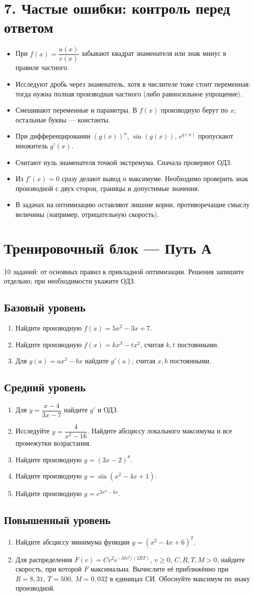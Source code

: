 \documentclass[a4paper,12pt]{article}
\newcommand{\sect}[1]{\section*{\textcolor{darkaccent}{#1}}}
\newcommand{\subsect}[1]{\subsection*{\textcolor{accent}{#1}}}
\begin{document}
\sect{7. Частые ошибки: контроль перед ответом}
\begin{itemize}
\item При \(f(x)=\dfrac{u(x)}{v(x)}\) забывают квадрат знаменателя или знак минус в правиле частного.
\item Исследуют дробь через знаменатель, хотя в числителе тоже стоит переменная: тогда нужна полная производная частного (либо равносильное упрощение).
\item Смешивают переменные и параметры. В \(f(x)\) производную берут по \(x\); остальные буквы --- константы.
\item При дифференцировании \((g(x))^n\), \(\sin(g(x))\), \(e^{g(x)}\) пропускают множитель \(g'(x)\).
\item Считают нуль знаменателя точкой экстремума. Сначала проверяют ОДЗ.
\item Из \(f'(x)=0\) сразу делают вывод о максимуме. Необходимо проверить знак производной с двух сторон, границы и допустимые значения.
\item В задачах на оптимизацию оставляют лишние корни, противоречащие смыслу величины (например, отрицательную скорость).
\end{itemize}

\clearpage
\sect{Тренировочный блок --- Путь А}
\textcolor{muted}{10 заданий: от основных правил к прикладной оптимизации. Решения запишите отдельно; при необходимости укажите ОДЗ.}
\subsect{Базовый уровень}
\begin{enumerate}
\item Найдите производную \(f(x)=5x^2-3x+7\).
\item Найдите производную \(f(x)=kx^3-tx^2\), считая \(k,t\) постоянными.
\item Для \(g(a)=ax^3-bx\) найдите \(g'(a)\), считая \(x,b\) постоянными.
\end{enumerate}
\subsect{Средний уровень}
\begin{enumerate}[start=4]
\item Для \(y=\dfrac{x-4}{3x-7}\) найдите \(y'\) и ОДЗ.
\item Исследуйте \(y=\dfrac{4}{x^2-16}\). Найдите абсциссу локального максимума и все промежутки возрастания.
\item Найдите производную \(y=(3x-2)^8\).
\item Найдите производную \(y=\sin(x^2-4x+1)\).
\item Найдите производную \(y=e^{2x^2-3x}\).
\end{enumerate}
\subsect{Повышенный уровень}
\begin{enumerate}[start=9]
\item Найдите абсциссу минимума функции \(y=(x^2-4x+6)^2\).
\item Для распределения \(F(v)=Cv^2 e^{-Mv^2/(2RT)}\), \(v\ge0\), \(C,R,T,M>0\), найдите скорость, при которой \(F\) максимальна. Вычислите её приближённо при \(R=8{,}31\), \(T=500\), \(M=0{,}032\) в единицах СИ. Обоснуйте максимум по знаку производной.
\end{enumerate}
\clearpage
\end{document}
